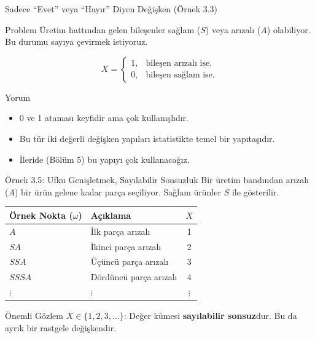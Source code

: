 \documentclass[light]{lutbeamer}
\begin{document}
\begin{frame}{Sadece ``Evet'' veya ``Hayır'' Diyen Değişken (Örnek 3.3)}
\begin{block}{Problem}
  Üretim hattından gelen bileşenler sağlam ($S$) veya arızalı ($A$) olabiliyor.
  Bu durumu sayıya çevirmek istiyoruz.
\end{block}

\[
X =
\begin{cases}
1, & \text{bileşen arızalı ise},\\
0, & \text{bileşen sağlam ise}.
\end{cases}
\]

\begin{block}{Yorum}
  \begin{itemize}
    \item 0 ve 1 ataması keyfidir ama çok kullanışlıdır.
    \item Bu tür iki değerli değişken yapıları istatistikte temel bir yapıtaşıdır.
    \item İleride (Bölüm 5) bu yapıyı çok kullanacağız.
  \end{itemize}
\end{block}
\end{frame}

\begin{frame}{Örnek 3.5: Ufku Genişletmek, Sayılabilir Sonsuzluk}
\small
Bir üretim bandından arızalı ($A$) bir ürün gelene kadar parça seçiliyor. Sağlam ürünler $S$ ile gösterilir.
\begin{center}
\begin{tabular}{llc}
    \toprule
    Örnek Nokta ($\omega$) & Açıklama & $X$ \\
    \midrule
    $A$ & İlk parça arızalı & 1 \\
    $SA$ & İkinci parça arızalı & 2 \\
    $SSA$ & Üçüncü parça arızalı & 3 \\
    $SSSA$ & Dördüncü parça arızalı & 4 \\
    $\vdots$ & $\vdots$ & $\vdots$ \\
    \bottomrule
\end{tabular}
\end{center}
\begin{alertblock}{Önemli Gözlem}
    $X \in \{1, 2, 3, \dots\}$: Değer kümesi \textbf{sayılabilir sonsuz}dur. Bu da ayrık bir rastgele değişkendir.
\end{alertblock}
\end{frame}
\end{document}
